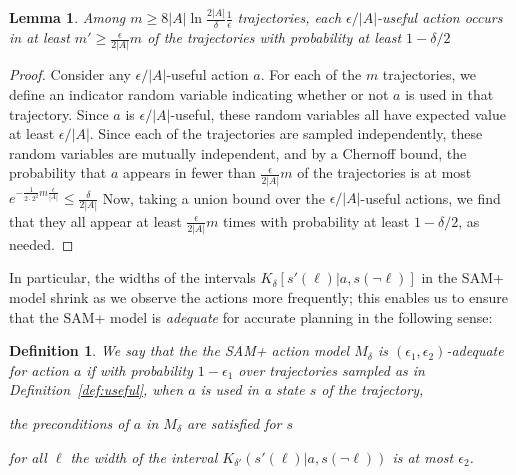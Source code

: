 \documentclass[letterpaper]{article} %
\newtheorem{definition}{Definition}
\newtheorem{lemma}{Lemma}
\begin{document}
\begin{lemma}\label{lem:many-useful}
Among  $m \geq 8|A|\ln\frac{2|A|}{\delta}\frac{1}{\epsilon}$
trajectories, each $\epsilon/|A|$-useful action occurs in at least
$m' \geq \frac{\epsilon}{2|A|}m$
of the trajectories with probability at least $1-\delta/2$
\end{lemma}
\begin{proof}
Consider any $\epsilon/|A|$-useful action $a$. For each of the $m$ trajectories, we define an indicator random variable indicating whether or not $a$ is used in that trajectory. Since $a$ is $\epsilon/|A|$-useful, these random variables all have expected value at least $\epsilon/|A|$. Since each of the trajectories are sampled independently, these random variables are mutually independent, and by a Chernoff bound, the probability that $a$ appears in fewer than $\frac{\epsilon}{2|A|}m$ of the trajectories is at most
$
e^{-\frac{1}{2\cdot 2^2}m\frac{\epsilon}{|A|}}\leq\frac{\delta}{2|A|}
$
Now, taking a union bound over the $\epsilon/|A|$-useful actions, we find that they all appear at least $\frac{\epsilon}{2|A|}m$ times with probability at least $1-\delta/2$, as needed.
\end{proof}

In particular, the widths of the intervals $K_\delta[s'(\ell)|a,s(\neg\ell)]$ in the SAM+ model shrink as we observe the actions more frequently; this enables us to ensure that the SAM+ model is \emph{adequate} for accurate planning in the following sense:

\begin{definition}
We say that the the SAM+ action model $M_\delta$ is \emph{$(\epsilon_1,\epsilon_2)$-adequate} for action $a$ if with probability $1-\epsilon_1$ over trajectories sampled as in Definition~\ref{def:useful}, when $a$ is used in a state $s$ of the trajectory,
\begin{compactenum}
\item the preconditions of $a$ in $M_\delta$ are satisfied for $s$
\item for all $\ell$ the width of the interval $K_{\delta'}(s'(\ell)|a,s(\neg\ell))$ is at most $\epsilon_2$.
\end{compactenum}
\end{definition}
\end{document}

